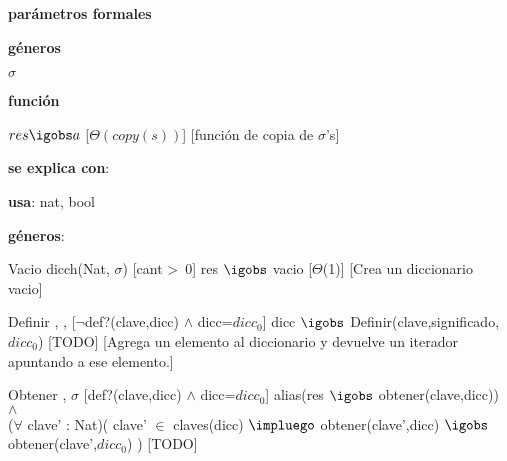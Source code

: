 \begin{Interfaz}

	\textbf{parámetros formales}\parindent\\
	\parbox{1.7cm}{\textbf{géneros}} $\sigma$\\
	\parbox[t]{1.7cm}{\textbf{función}}\parbox[t]{\textwidth-2\parindent-1.7cm}{%
	    	{$res \igobs a$}
		[$\Theta(copy(s))$]
		[función de copia de $\sigma$'s]
	}
	
	\textbf{se explica con}: 
	
	\textbf{usa}: nat, bool
	
	\textbf{géneros}: 
	
	
	\InterfazFuncion
	{Vacio}
	{}
	{dicch(Nat, $\sigma$)}
	[cant >\ 0]
	{res $\igobs$ vacio}
	[$\Theta$(1)]
	[Crea un diccionario vacio]
	
	\InterfazFuncion
	{Definir}
	{, ,}
	{}
	[$\neg$def?(clave,dicc) $\land$ dicc=$dicc_0$]
	{dicc $\igobs$ Definir(clave,significado,$dicc_0$)}
	[TODO]
	[Agrega un elemento al diccionario y devuelve un iterador apuntando a ese elemento.]	
	
	\InterfazFuncion
	{Obtener}
	{,}
	{$\sigma$}
	[def?(clave,dicc) $\land$ dicc=$dicc_0$]
	{alias(res $\igobs$ obtener(clave,dicc)) 
		$\land$\\ ($\forall$ clave' : Nat)( clave' $\in$ claves(dicc) $\impluego$ obtener(clave',dicc) $\igobs$ obtener(clave',$dicc_0$) )}
	[TODO]
	
\end{Interfaz}

